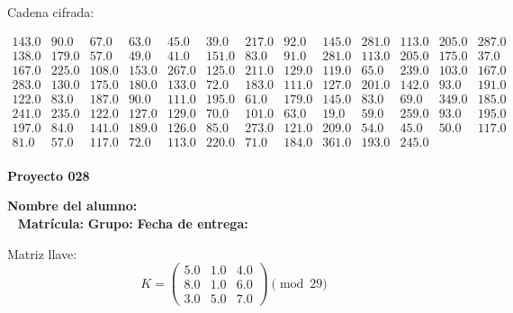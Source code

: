 \documentclass[12pt]{article}
\begin{document}
Cadena cifrada:
\begin{center}
$\begin{array}{lllllllllllll}
143.0 & 90.0 & 67.0 & 63.0 & 45.0 & 39.0 & 217.0 & 92.0 & 145.0 & 281.0 & 113.0 & 205.0 & 287.0\\
138.0 & 179.0 & 57.0 & 49.0 & 41.0 & 151.0 & 83.0 & 91.0 & 281.0 & 113.0 & 205.0 & 175.0 & 37.0\\
167.0 & 225.0 & 108.0 & 153.0 & 267.0 & 125.0 & 211.0 & 129.0 & 119.0 & 65.0 & 239.0 & 103.0 & 167.0\\
283.0 & 130.0 & 175.0 & 180.0 & 133.0 & 72.0 & 183.0 & 111.0 & 127.0 & 201.0 & 142.0 & 93.0 & 191.0\\
122.0 & 83.0 & 187.0 & 90.0 & 111.0 & 195.0 & 61.0 & 179.0 & 145.0 & 83.0 & 69.0 & 349.0 & 185.0\\
241.0 & 235.0 & 122.0 & 127.0 & 129.0 & 70.0 & 101.0 & 63.0 & 19.0 & 59.0 & 259.0 & 93.0 & 195.0\\
197.0 & 84.0 & 141.0 & 189.0 & 126.0 & 85.0 & 273.0 & 121.0 & 209.0 & 54.0 & 45.0 & 50.0 & 117.0\\
81.0 & 57.0 & 117.0 & 72.0 & 113.0 & 220.0 & 71.0 & 184.0 & 361.0 & 193.0 & 245.0\\
\end{array}$
\end{center}

\newpage


\textbf{Proyecto 028}

\textbf{Nombre del alumno:} \underline{\hspace{13cm}}\\\
\vspace{1cm}
\textbf{Matrícula:} \underline{\hspace{4cm}} \hspace{1cm}
\textbf{Grupo:} \underline{\hspace{2cm}}
\textbf{Fecha de entrega:} \underline{\hspace{2cm}}

\medskip

Matriz llave:
\[
K = \begin{pmatrix}
5.0 & 1.0 & 4.0\\
8.0 & 1.0 & 6.0\\
3.0 & 5.0 & 7.0
\end{pmatrix} \pmod{29}
\]
\end{document}
